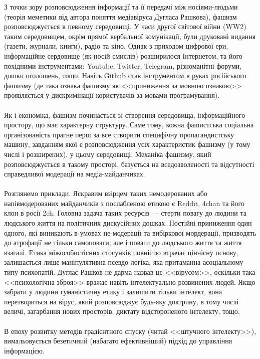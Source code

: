 З точки зору розповсюдження інформації та її передачі між носіями-людьми (теорія
меметики від автора поняття медіавіруса Дугласа Рашкова), фашизм розповсюджується
в певному середовищі. У часи другої світової війни (WW2) таким середовищем, окрім
прямої вербальної комунікації, були друковані видання (газети, журнали, книги),
радіо та кіно. Однак з приходом цифрової ери, інформаційне сердовище (як носій
смислів) розширилося Інтернетом, та його похідними інструментами: Youtube, Twitter,
Telegram, різноманітні форуми, дошки оголошень, тощо. Навіть Github став інструментом
в руках російського фашизму (де така ознака фашизму як <<приниження за мовною ознакою>>
проявляється у дискримінації користувачів за мовами програмування).
\\
\\
Як і економіка, фашизм починається зі створення середовища, інформаційного простору,
що має характерну структуру. Саме тому, кожна фашистська соціальна організованість
прагне перш за все створити специфічну пропагандистську машину, завданням якої є
розповсюдження усіх характеристик фашизму (у тому числі і розширених), у цьому
середовищі. Механіка фашизму, який розповсюджується в такому просторі, базується
на вседозволеності та відсутності справедливої модерації на медіа-майданчиках.
\\
\\
Розглянемо приклади. Яскравим взірцем таких немодерованих або напівмодерованих
майданчиків з послабленою етикою є Reddit, 4chan та його клон в росії 2ch.
Головна задача таких ресурсів — стерти повагу до людини та людського життя
на політичних дискусійних дошках. Постійні приниження один одного, які виникають
в умовах не-модерації та вибіркової мордерації, призводять до атрофації не тільки
самоповаги, але і поваги до людського життя та життя взагалі. Етика міжособистісних
стосунків повністю втрачає ціннісну основу, залишається лише маніпулятивна
псевдо-логіка, яка притаманна асоціальному типу психопатій. Дуглас Рашков
не дарма назвав це <<вірусом>>, оскільки така <<психологічна зброя>> вражає
навіть інтелектуально розвинених людей. Якщо забрати у людини гуманістичну
етику і залишити тільки інтелект, вона перетвориться на вірус, який розповсюджує
будь-яку доктрину, в тому числі величі, загарбання нових просторів, диктату
відстороненого інтелекту, тощо.
\\
\\
В епоху розвитку методів градієнтного спуску (читай <<штучного інтелекту>>),
вимальовується безетичний (набагато ефективніший) підхід до управління інформацією.
